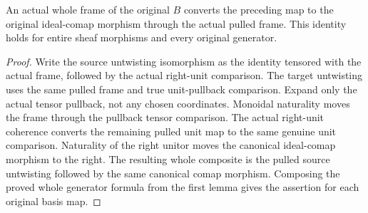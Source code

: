 \begin{lemma}
\leanok
\label{lem:kn-nadel-nef-big-global-frame-untwist}
An actual whole frame of the original $B$ converts the preceding map to
the original ideal-comap morphism through the actual pulled frame. This
identity holds for entire sheaf morphisms and every original generator.
\end{lemma}
\begin{proof}
Write the source untwisting isomorphism as the identity tensored with the
actual frame, followed by the actual right-unit comparison. The target
untwisting uses the same pulled frame and true unit-pullback comparison.
Expand only the actual tensor pullback, not any chosen coordinates.
Monoidal naturality moves the frame through the pullback tensor comparison.
The actual right-unit coherence converts the remaining pulled unit map
to the same genuine unit comparison. Naturality of the right unitor
moves the canonical ideal-comap morphism to the right. The resulting
whole composite is the pulled source untwisting followed by the same
canonical comap morphism. Composing the proved whole generator formula
from the first lemma gives the assertion for each original basis map.
\end{proof}

